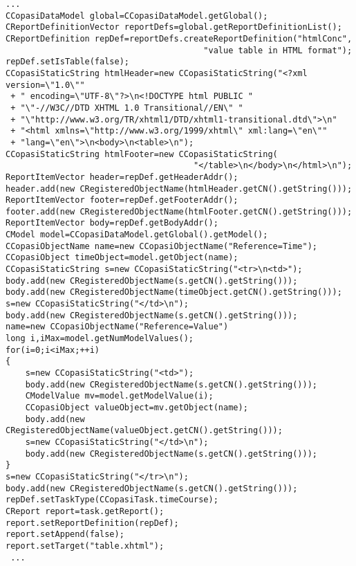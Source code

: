 \documentclass[a4,10pt]{article}
\begin{document}
\begin{lstlisting}
...
CCopasiDataModel global=CCopasiDataModel.getGlobal();
CReportDefinitionVector reportDefs=global.getReportDefinitionList();
CReportDefinition repDef=reportDefs.createReportDefinition("htmlConc",
                                        "value table in HTML format");
repDef.setIsTable(false);
CCopasiStaticString htmlHeader=new CCopasiStaticString("<?xml version=\"1.0\"" 
 + " encoding=\"UTF-8\"?>\n<!DOCTYPE html PUBLIC "
 + "\"-//W3C//DTD XHTML 1.0 Transitional//EN\" "
 + "\"http://www.w3.org/TR/xhtml1/DTD/xhtml1-transitional.dtd\">\n"
 + "<html xmlns=\"http://www.w3.org/1999/xhtml\" xml:lang=\"en\""
 + "lang=\"en\">\n<body>\n<table>\n");
CCopasiStaticString htmlFooter=new CCopasiStaticString(
                                      "</table>\n</body>\n</html>\n");
ReportItemVector header=repDef.getHeaderAddr(); 
header.add(new CRegisteredObjectName(htmlHeader.getCN().getString()));
ReportItemVector footer=repDef.getFooterAddr(); 
footer.add(new CRegisteredObjectName(htmlFooter.getCN().getString()));
ReportItemVector body=repDef.getBodyAddr(); 
CModel model=CCopasiDataModel.getGlobal().getModel();
CCopasiObjectName name=new CCopasiObjectName("Reference=Time");
CCopasiObject timeObject=model.getObject(name);
CCopasiStaticString s=new CCopasiStaticString("<tr>\n<td>");
body.add(new CRegisteredObjectName(s.getCN().getString()));
body.add(new CRegisteredObjectName(timeObject.getCN().getString()));
s=new CCopasiStaticString("</td>\n");
body.add(new CRegisteredObjectName(s.getCN().getString()));
name=new CCopasiObjectName("Reference=Value")
long i,iMax=model.getNumModelValues();
for(i=0;i<iMax;++i)
{
    s=new CCopasiStaticString("<td>");
    body.add(new CRegisteredObjectName(s.getCN().getString()));
    CModelValue mv=model.getModelValue(i);
    CCopasiObject valueObject=mv.getObject(name);
    body.add(new CRegisteredObjectName(valueObject.getCN().getString()));
    s=new CCopasiStaticString("</td>\n");
    body.add(new CRegisteredObjectName(s.getCN().getString()));
}
s=new CCopasiStaticString("</tr>\n");
body.add(new CRegisteredObjectName(s.getCN().getString()));
repDef.setTaskType(CCopasiTask.timeCourse);
CReport report=task.getReport();
report.setReportDefinition(repDef);
report.setAppend(false);
report.setTarget("table.xhtml");
 ...
\end{lstlisting}
\end{document}
